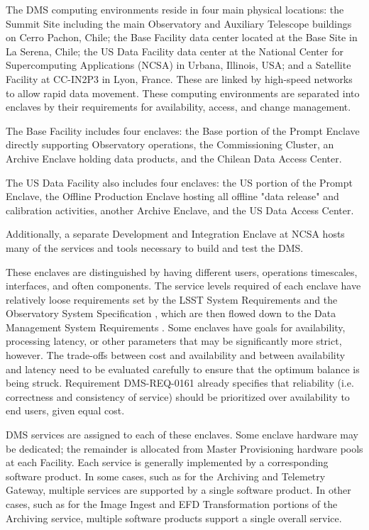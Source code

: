 \documentclass[DM,toc,lsstdraft]{lsstdoc}
\begin{document}
The DMS computing environments reside in four main physical locations:
the Summit Site including the main Observatory and Auxiliary Telescope
buildings on Cerro Pachon, Chile; the Base Facility data center located
at the Base Site in La Serena, Chile; the US Data Facility data center
at the National Center for Supercomputing Applications (NCSA) in Urbana,
Illinois, USA; and a Satellite Facility at CC-IN2P3 in Lyon,
France. These are linked by high-speed networks to allow rapid data
movement.
These computing environments are separated into enclaves by their requirements for availability, access, and change management.

The Base Facility includes four enclaves: the Base portion of the Prompt Enclave directly supporting Observatory operations, the Commissioning Cluster, an Archive Enclave holding data products, and the Chilean Data Access Center.

The US Data Facility also includes four enclaves: the US portion of the Prompt Enclave, the Offline Production Enclave hosting all offline "data release" and calibration activities, another Archive Enclave, and the US Data Access Center.

Additionally, a separate Development and Integration Enclave at NCSA hosts many of the services and tools necessary to build and test the DMS.

These enclaves are distinguished by having different users, operations timescales, interfaces, and often components.
The service levels required of each enclave have relatively loose requirements set by the LSST System Requirements  and the Observatory System Specification , which are then flowed down to the Data Management System Requirements .
Some enclaves have goals for availability, processing latency, or other parameters that may be significantly more strict, however.
The trade-offs between cost and availability and between availability and latency need to be evaluated carefully to ensure that the optimum balance is being struck.
Requirement DMS-REQ-0161 already specifies that reliability (i.e. correctness and consistency of service) should be prioritized over availability to end users, given equal cost.

DMS services are assigned to each of these enclaves.  Some enclave hardware may be dedicated; the remainder is allocated from Master Provisioning hardware pools at each Facility.
Each service is generally implemented by a corresponding software product.
In some cases, such as for the Archiving and Telemetry Gateway, multiple services are supported by a single software product.
In other cases, such as for the Image Ingest and EFD Transformation portions of the Archiving service, multiple software products support a single overall service.
\end{document}

